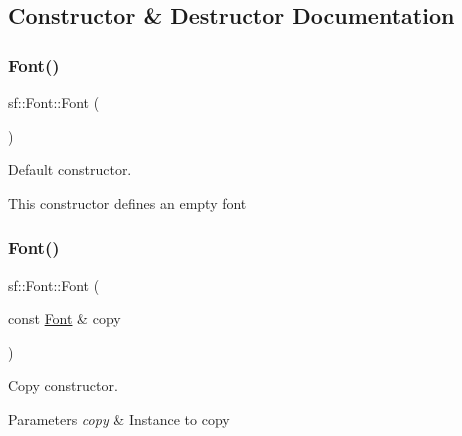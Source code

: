 \subsection{Constructor \& Destructor Documentation}
\mbox{\label{classsf_1_1_font_a506404655b8869ed60d1e7709812f583}} 
\subsubsection{\texorpdfstring{Font()}{Font()}\hspace{0.1cm}{\footnotesize\ttfamily [1/2]}}
{\footnotesize\ttfamily sf\+::\+Font\+::\+Font (\begin{DoxyParamCaption}{ }\end{DoxyParamCaption})}



Default constructor. 

This constructor defines an empty font \begin{DoxyVerb}\end{DoxyVerb}
 \mbox{\label{classsf_1_1_font_a72d7322b355ee2f1be4500f530e98081}} 
\subsubsection{\texorpdfstring{Font()}{Font()}\hspace{0.1cm}{\footnotesize\ttfamily [2/2]}}
{\footnotesize\ttfamily sf\+::\+Font\+::\+Font (\begin{DoxyParamCaption}\item[{const \mbox{\hyperlink{classsf_1_1_font}{Font}} \&}]{copy }\end{DoxyParamCaption})}



Copy constructor. 


\begin{DoxyParams}{Parameters}
{\em copy} & Instance to copy \begin{DoxyVerb}\end{DoxyVerb}
 \\
\hline
\end{DoxyParams}
\mbox{\label{classsf_1_1_font_aa18a3c62e6e01e9a21c531b5cad4b7f2}} 
